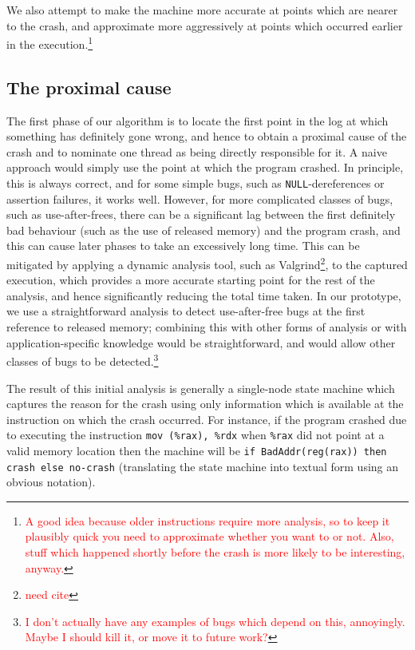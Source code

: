\documentclass[10pt,twocolumn,preprint,natbib,authoryear]{sigplanconf}
\newcommand{\editorial}[1]{\textcolor{red}{\footnote{\textcolor{red}{#1}}}}
\newcommand{\needCite}{\editorial{need cite}}
\begin{document}
We also attempt to make the machine more accurate at points which are
nearer to the crash, and approximate more aggressively at points which
occurred earlier in the execution.\editorial{A good idea because older
  instructions require more analysis, so to keep it plausibly quick
  you need to approximate whether you want to or not.  Also, stuff
  which happened shortly before the crash is more likely to be
  interesting, anyway.}

\subsection{The proximal cause}
The first phase of our algorithm is to locate the first point in the
log at which something has definitely gone wrong, and hence to obtain
a proximal cause of the crash and to nominate one thread as being
directly responsible for it.  A naive approach would simply use the
point at which the program crashed.  In principle, this is always
correct, and for some simple bugs, such as \verb|NULL|-dereferences or
assertion failures, it works well.  However, for more complicated
classes of bugs, such as use-after-frees, there can be a significant
lag between the first definitely bad behaviour (such as the use of
released memory) and the program crash, and this can cause later
phases to take an excessively long time.  This can be mitigated by
applying a dynamic analysis tool, such as Valgrind\needCite{}, to the
captured execution, which provides a more accurate starting point for
the rest of the analysis, and hence significantly reducing the total
time taken.  In our prototype, we use a straightforward analysis to
detect use-after-free bugs at the first reference to released memory;
combining this with other forms of analysis or with
application-specific knowledge would be straightforward, and would
allow other classes of bugs to be detected.\editorial{I don't actually
  have any examples of bugs which depend on this, annoyingly.  Maybe I
  should kill it, or move it to future work?}

The result of this initial analysis is generally a single-node state
machine which captures the reason for the crash using only information
which is available at the instruction on which the crash occurred.
For instance, if the program crashed due to executing the instruction
\verb|mov (%rax), %rdx| when \verb|%rax| did not point at a valid
memory location then the machine will be
\verb|if BadAddr(reg(rax)) then crash else no-crash| (translating the
state machine into textual form using an obvious notation).
\end{document}
